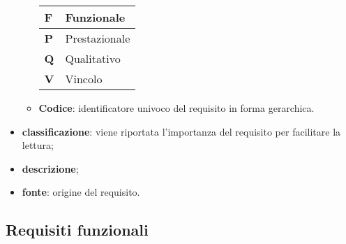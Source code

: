 \begin{itemize}
\begin{itemize}
\begin{center}
                \renewcommand{\arraystretch}{1.5}
                \begin{tabular}{m{2em} m{10em}}
                    \hline
                    \textbf{F} & Funzionale \\
                    \hline
                    \textbf{P} & Prestazionale \\
                    \hline
                    \textbf{Q} & Qualitativo \\
                    \hline
                    \textbf{V} &  Vincolo \\
                    \hline
                \end{tabular}
                \smallskip
            \end{center}
            
            \item \textbf{Codice}: identificatore univoco del 				requisito in forma gerarchica.
        \end{itemize}

		
        \item \textbf{classificazione}: viene riportata 						l'importanza del requisito per facilitare la 						lettura;
        \item \textbf{descrizione};
        \item \textbf{fonte}: origine del requisito.
    \end{itemize}

\newpage

\subsection{Requisiti funzionali}
    
